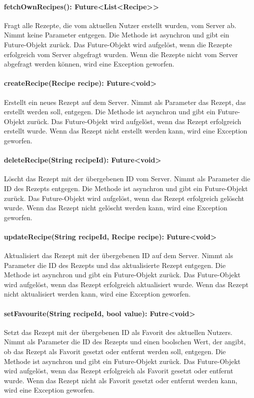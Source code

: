 \documentclass[parskip=full]{scrartcl}
\begin{document}
\paragraph{fetchOwnRecipes(): Future<List<Recipe>>}
Fragt alle Rezepte, die vom aktuellen Nutzer erstellt wurden, vom Server ab. Nimmt keine Parameter entgegen. Die Methode ist asynchron und gibt ein Future-Objekt zurück. Das Future-Objekt wird aufgelöst, wenn die Rezepte erfolgreich vom Server abgefragt wurden. Wenn die Rezepte nicht vom Server abgefragt werden können, wird eine Exception geworfen.
\paragraph{createRecipe(Recipe recipe): Future<void>}
Erstellt ein neues Rezept auf dem Server. Nimmt als Parameter das Rezept, das erstellt werden soll, entgegen. Die Methode ist asynchron und gibt ein Future-Objekt zurück. Das Future-Objekt wird aufgelöst, wenn das Rezept erfolgreich erstellt wurde. Wenn das Rezept nicht erstellt werden kann, wird eine Exception geworfen.
\paragraph{deleteRecipe(String recipeId): Future<void>}
Löscht das Rezept mit der übergebenen ID vom Server. Nimmt als Parameter die ID des Rezepts entgegen. Die Methode ist asynchron und gibt ein Future-Objekt zurück. Das Future-Objekt wird aufgelöst, wenn das Rezept erfolgreich gelöscht wurde. Wenn das Rezept nicht gelöscht werden kann, wird eine Exception geworfen.
\paragraph{updateRecipe(String recipeId, Recipe recipe): Future<void>}
Aktualisiert das Rezept mit der übergebenen ID auf dem Server. Nimmt als Parameter die ID des Rezepts und das aktualisierte Rezept entgegen. Die Methode ist asynchron und gibt ein Future-Objekt zurück. Das Future-Objekt wird aufgelöst, wenn das Rezept erfolgreich aktualisiert wurde. Wenn das Rezept nicht aktualisiert werden kann, wird eine Exception geworfen.
\paragraph{setFavourite(String recipeId, bool value): Futre<void>}
Setzt das Rezept mit der übergebenen ID als Favorit des aktuellen Nutzers. Nimmt als Parameter die ID des Rezepts und einen boolschen Wert, der angibt, ob das Rezept als Favorit gesetzt oder entfernt werden soll, entgegen. Die Methode ist asynchron und gibt ein Future-Objekt zurück. Das Future-Objekt wird aufgelöst, wenn das Rezept erfolgreich als Favorit gesetzt oder entfernt wurde. Wenn das Rezept nicht als Favorit gesetzt oder entfernt werden kann, wird eine Exception geworfen.
\newpage
\end{document}
